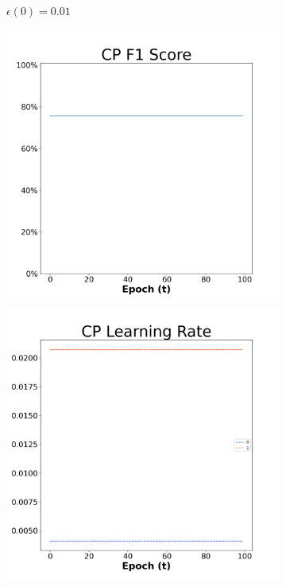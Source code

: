 \begin{figure}[H]
\begin{subfigure}{0.3\textwidth}
  \caption{$\epsilon(0)=0.01$}
\end{subfigure}\hfil %
\begin{subfigure}{0.3\textwidth}
  \includegraphics[width=\linewidth]{images/exper2/NSP/CP_0.03_f1.png}
  \includegraphics[width=\linewidth]{images/exper2/NSP/CP_0.03_lr.png}

\end{subfigure}
\end{figure}
